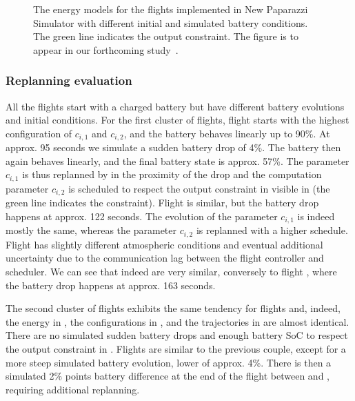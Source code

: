 \begin{figure}[p!]
  \centering
  \selectfont
  \footnotesize    
  
  \caption[The energy models for the flights implemented in New Paparazzi Simulator]{The energy models for the flights implemented in New Paparazzi Simulator with different initial and simulated battery conditions. The green line indicates the output constraint. The figure is to appear in our forthcoming study~\citep{seewald202Xenergy}.}
  \label{fig:ener-pprz}
\end{figure}

\subsubsection*{Replanning evaluation}

All the flights start with a charged battery but have different battery evolutions and initial conditions. For the first cluster of flights, flight  starts with the highest configuration of $c_{i,1}$ and $c_{i,2}$, and the battery behaves linearly up to 90\%. At approx. 95 seconds we simulate a sudden battery drop of 4\%. The battery then again behaves linearly, and the final battery state is approx. 57\%. The parameter $c_{i,1}$ is thus replanned by  in the proximity of the drop and the computation parameter $c_{i,2}$ is scheduled to respect the output constraint in  visible in  (the green line indicates the constraint). Flight  is similar, but the battery drop happens at approx. 122 seconds. The evolution of the parameter $c_{i,1}$ is indeed mostly the same, whereas the parameter $c_{i,2}$ is replanned with a higher schedule. Flight  has slightly different atmospheric conditions and eventual additional uncertainty due to the communication lag between the flight controller and scheduler. We can see that indeed  are very similar, conversely to flight , where the battery drop happens at approx. 163 seconds.

The second cluster of flights exhibits the same tendency for flights  and, indeed, the energy in , the configurations in , and the trajectories in  are almost identical. There are no simulated sudden battery drops and enough battery SoC to respect the output constraint in . Flights  are similar to the previous couple, except for a more steep simulated battery evolution, lower of approx. 4\%. There is then a simulated 2\% points battery difference at the end of the flight between  and , requiring additional replanning.

